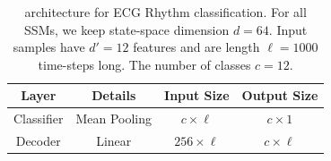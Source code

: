 \begin{table}[]
\centering
\caption{\ourmethod{} architecture for ECG Rhythm classification. For all SSMs, we keep state-space dimension $d = 64$. Input samples have $d' = 12$ features and are length $\ell = 1000$ time-steps long. The number of classes $c = 12$.}
\label{tab:spacetime_ecg_rhythm}
\begin{tabular}{@{}c|c|c|c@{}}
Layer       & Details                                                                                                                                                                                                                                                                                                                                                                                                                                                                                                                                & Input Size        & Output Size       \\ \midrule
Classifier  & Mean Pooling                                                                                                                                                                                                                                                                                                                                                                                                                                                                                                                           & $c \times \ell$   & $c \times 1$      \\ \midrule
Decoder     & Linear                                                                                                                                                                                                                                                                                                                                                                                                                                                                                                                                 & $256 \times \ell$ & $c \times \ell$   \\ \midrule

\end{tabular}
\end{table}
